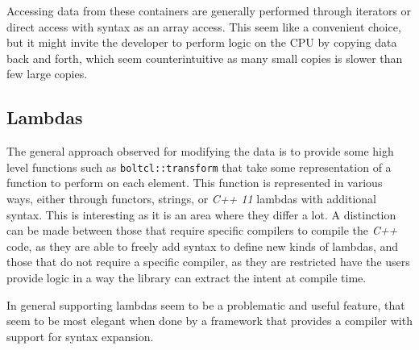 Accessing data from these containers are generally performed through iterators or direct access with syntax as an array access. This seem like a convenient choice, but it might invite the developer to perform logic on the CPU by copying data back and forth, which seem counterintuitive as many small copies is slower than few large copies.

\subsection{Lambdas}
The general approach observed for modifying the data is to provide some high level functions such as \texttt{boltcl::transform} that take some representation of a function to perform on each element. This function is represented in various ways, either through functors, strings, or \textit{C++ 11} lambdas with additional syntax. This is interesting as it is an area where they differ a lot. A distinction can be made between those that require specific compilers to compile the \textit{C++} code, as they are able to freely add syntax to define new kinds of lambdas, and those that do not require a specific compiler, as they are restricted have the users provide logic in a way the library can extract the intent at compile time.

In general supporting lambdas seem to be a problematic and useful feature, that seem to be most elegant when done by a framework that provides a compiler with support for syntax expansion.